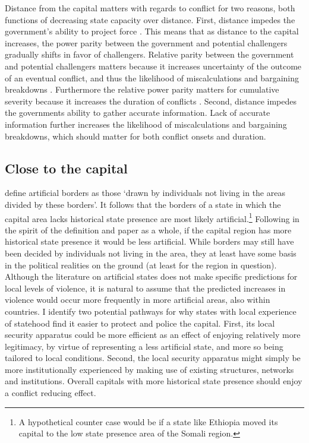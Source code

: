 Distance from the capital matters with regards to conflict for two reasons, both
functions of decreasing state capacity over distance. First, distance impedes
the government's ability to project force \citep{Boulding1963, Buhaug_2010,
Buhaug2009, Herbst2014}. This means that as distance to the capital increases,
the power parity between the government and potential challengers gradually
shifts in favor of challengers. Relative parity between the government and
potential challengers matters because it increases uncertainty of the outcome of
an eventual conflict, and thus the likelihood of miscalculations and bargaining
breakdowns \citep{Boulding1963, Buhaug_2010}. Furthermore the relative power
parity matters for cumulative severity because it increases the duration of
conflicts \citep{Buhaug2009}. Second, distance impedes the governments ability
to gather accurate information. Lack of accurate information further increases
the likelihood of miscalculations and bargaining breakdowns, which should matter
for both conflict onsets and duration.

\subsection{Close to the capital} \label{Close}

\citet{Alesina2011} define artificial borders as those `drawn by individuals
not living in the areas divided by these borders'. It follows that the borders of
a state in which the capital area lacks historical state presence are most
likely artificial.\footnote{A hypothetical counter case would be if a state like
Ethiopia moved its capital to the low state presence area of the Somali region.}
Following in the spirit of the definition and paper as a whole, if the capital
region has more historical state presence it would be less artificial. While
borders may still have been decided by individuals not living in the area, they
at least have some basis in the political realities on the ground (at least for
the region in question). Although the literature on artificial states does not
make specific predictions for local levels of violence, it is natural to assume
that the predicted increases in violence would occur more frequently in more
artificial areas, also within countries. I identify two potential pathways for
why states with local experience of statehood find it easier to protect and
police the capital. First, its local security apparatus could be more efficient
as an effect of enjoying relatively more legitimacy, by virtue of representing a
less artificial state, and more so being tailored to local conditions. Second,
the local security apparatus might simply be more institutionally experienced by
making use of existing structures, networks and institutions. Overall capitals
with more historical state presence should enjoy a conflict reducing effect.

